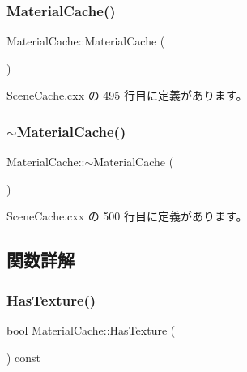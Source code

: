 \subsubsection{\texorpdfstring{Material\+Cache()}{MaterialCache()}}
{\footnotesize\ttfamily Material\+Cache\+::\+Material\+Cache (\begin{DoxyParamCaption}{ }\end{DoxyParamCaption})}



 Scene\+Cache.\+cxx の 495 行目に定義があります。

\mbox{\label{class_material_cache_a7dd31e54dbebde879ea515e588fadc55}} 
\subsubsection{\texorpdfstring{$\sim$\+Material\+Cache()}{~MaterialCache()}}
{\footnotesize\ttfamily Material\+Cache\+::$\sim$\+Material\+Cache (\begin{DoxyParamCaption}{ }\end{DoxyParamCaption})}



 Scene\+Cache.\+cxx の 500 行目に定義があります。



\subsection{関数詳解}
\mbox{\label{class_material_cache_aa445a6494d0099b63d57c80bc04dfef2}} 
\subsubsection{\texorpdfstring{Has\+Texture()}{HasTexture()}}
{\footnotesize\ttfamily bool Material\+Cache\+::\+Has\+Texture (\begin{DoxyParamCaption}{ }\end{DoxyParamCaption}) const\hspace{0.3cm}{\ttfamily [inline]}}



